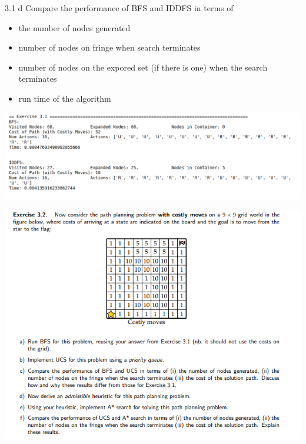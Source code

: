 \documentclass[11pt]{beamer}
\begin{document}
\begin{frame}{3.1 d}
Compare the performance of BFS and IDDFS in terms of
\begin{itemize}
	\item the number of nodes generated
	\item number of nodes on fringe when search terminates
	\item number of nodes on the expored set (if there is one) when the search terminates
	\item run time of the algorithm
\end{itemize}
\pause
\includegraphics[scale=0.25]{31d.png}
\end{frame}

\begin{frame}{3.2}
\includegraphics[scale=0.5]{32q.png}
\end{frame}
\end{document}
